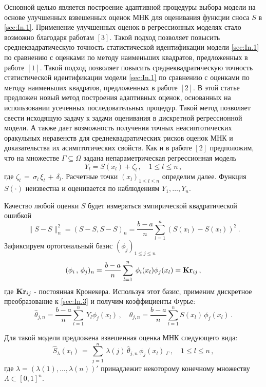  Основной целью является построение адаптивной процедуры выбора модели на основе улучшенных взвешенных оценок МНК для оценивания функции сноса $S$ в \eqref{sec:In.1}. Применение улучшенных оценок в регрессионных моделях стало возможно благодаря работам $[3]$. Такой подход позволяет повысить среднеквадратическую точность статистической идентификации модели \eqref{sec:In.1} по сравнению с оценками по методу наименьших квадратов, предложенных в работе $[1]$. Такой подход позволяет повысить среднеквадратическую точность статистической идентификации модели \eqref{sec:In.1} по сравнению с оценками по методу наименьших квадратов, предложенных в работе $[2]$. В этой статье предложен новый метод построения адаптивных оценок, основанных на использовании усеченных последовательных процедур. Такой метод позволяет свести исходящую задачу к задачи оценивания в дискретной регрессионной модели. А также  дает возможность получения точных неасиптотических оракульных неравенств для среднеквадратических рисков оценок МНК и доказательства их асимптотических свойств.
 Как и в работе $[2]$ предположим, что на множестве $\Gamma\subseteq\Omega$
задана непараметрическая регрессионная модель
\begin{equation}\label{sec:In.3}
Y_{l}=S(x_{l})+\zeta_{l}\,,\quad  1\le l\le n\,,
\end{equation}
где $\zeta_{l}\,=\,\sigma_{l}\,\xi_{l}\,+\,\delta_{l}$. Расчетные точки
$(x_{l})_{1\le l\le n}$
определим далее. Функция $S(\cdot)$ неизвестна и оценивается по наблюдениям $Y_1,\ldots,Y_n$.

Качество любой оценки  ${S}$ будет измеряться эмпирической квадратической ошибкой
$$
\|{S}-S\|^2_n=({S}-S,{S}-S)_{n}
=\frac{b-a}{n}\sum^n_{l=1}({S}(x_{l})-S(x_{l}))^2\,.
$$
Зафиксируем ортогональный базис $(\phi_{j})_{1\le j\le n}$
\begin{equation}\label{sec:In.6}
(\phi_i\,,\,\phi_{j})_{n}=
\frac{b-a}{n} \sum^n_{l=1}\,\phi_i(x_{l})\phi_{j}(x_{l})= {\bf Kr}_{ij}\,,
\end{equation}
где ${\bf Kr}_{ij}$ - постоянная Кронекера.
Используя этот базис, применим дискретное преобразование к
\eqref{sec:In.3} и получим коэффициенты Фурье:
$$
{\hat \theta}_{j,n}=\frac{b-a}{n}\sum^n_{l=1}\,Y_{l}\phi_{j}(x_{l})\,,
\quad
\theta_{j,n}=\frac{b-a}{n}\sum^n_{l=1}S(x_{l})\,\phi_{j}(x_{l})\,.
$$

Для такой модели предложена взвешенная оценка МНК следующего вида:
\begin{equation}\label{sec:In.7}
\hat {{S}}_{\lambda}(x_{l})\,=\,\sum^n_{j=1}\,\lambda(j)\,{\hat \theta}_{j,n}\,\phi_{j}(x_{l})\,
_{\Gamma}\,,\quad 1\le l\le n\,,
\end{equation}
где $\lambda=(\lambda(1),\ldots,\lambda(n))'$
принадлежит некоторому конечному множеству $\Lambda\subset [0,1]^n$.

